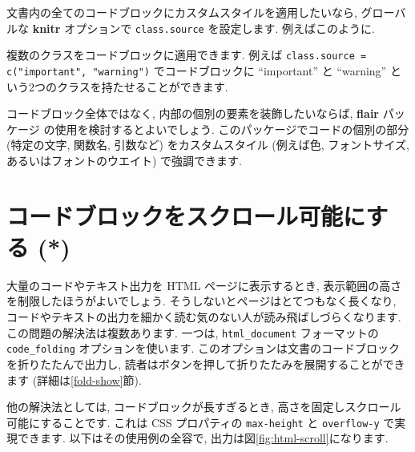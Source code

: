 \documentclass[
  11pt,
  lualatex,
  ja=standard]{bxjsreport}
\newenvironment{Shaded}{\begin{snugshade}}{\end{snugshade}}
\newcommand{\AttributeTok}[1]{\textcolor[rgb]{0.77,0.63,0.00}{#1}}
\newcommand{\FunctionTok}[1]{\textcolor[rgb]{0.00,0.00,0.00}{#1}}
\newcommand{\NormalTok}[1]{#1}
\newcommand{\SpecialCharTok}[1]{\textcolor[rgb]{0.00,0.00,0.00}{#1}}
\newcommand{\StringTok}[1]{\textcolor[rgb]{0.31,0.60,0.02}{#1}}
\begin{document}
文書内の全てのコードブロックにカスタムスタイルを適用したいなら, グローバルな \textbf{knitr} オプションで \texttt{class.source} を設定します. 例えばこのように.

\begin{Shaded}
\end{Shaded}

複数のクラスをコードブロックに適用できます. 例えば \texttt{class.source = c("important", "warning")} でコードブロックに ``important'' と ``warning'' という2つのクラスを持たせることができます.

コードブロック全体ではなく, 内部の個別の要素を装飾したいならば, \textbf{flair} パッケージ \autocite{R-flair} の使用を検討するとよいでしょう. このパッケージでコードの個別の部分 (特定の文字, 関数名, 引数など) をカスタムスタイル (例えば色, フォントサイズ, あるいはフォントのウエイト) で強調できます.

\hypertarget{html-scroll}{%
\section{コードブロックをスクロール可能にする (*)}\label{html-scroll}}

大量のコードやテキスト出力を HTML ページに表示するとき, 表示範囲の高さを制限したほうがよいでしょう. そうしないとページはとてつもなく長くなり, コードやテキストの出力を細かく読む気のない人が読み飛ばしづらくなります. この問題の解決法は複数あります. 一つは, \texttt{html\_document} フォーマットの \texttt{code\_folding} オプションを使います. このオプションは文書のコードブロックを折りたたんで出力し, 読者はボタンを押して折りたたみを展開することができます (詳細は\ref{fold-show}節).

他の解決法としては, コードブロックが長すぎるとき, 高さを固定しスクロール可能にすることです. これは CSS プロパティの \texttt{max-height} と \texttt{overflow-y} で実現できます. 以下はその使用例の全容で, 出力は図\ref{fig:html-scroll}になります.
\end{document}
